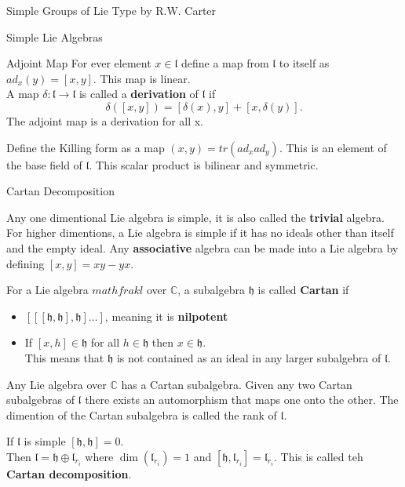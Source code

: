 \documentclass[12pt, letterpaper]{article}
\newcommand{\C}{\mathbb{C}}
\begin{document}
\begin{section}{Simple Groups of Lie Type by R.W. Carter}
\begin{subsection}{Simple Lie Algebras}
\begin{subsubsection}{Adjoint Map}
      For ever element \(x \in \mathfrak{l}\) define a map from \(\mathfrak{l}\)
      to itself as \(ad_{x}(y) = [x, y]\). This map is linear. \\
      A map \(\delta: \mathfrak{l} \to \mathfrak{l}\) is called a
      \textbf{derivation} of \(\mathfrak{l}\) if \[\delta([x, y]) =
        [\delta(x), y] + [x, \delta(y)].\] The adjoint map is a derivation for
      all x.

      Define the Killing form as a map \((x, y) = tr(ad_{x} ad_{y})\). This is
      an element of the base field of \(\mathfrak{l}\). This scalar product is
      bilinear and symmetric.

    \end{subsubsection}

    \begin{subsubsection}{Cartan Decomposition}

      Any one dimentional Lie algebra is simple, it is also called the
      \textbf{trivial} algebra. For higher dimentions, a Lie algebra is simple
      if it has no ideals other than itself and the empty ideal. Any
      \textbf{associative} algebra can be made into a Lie algebra by defining
      \([x, y] = xy - yx\).

      For a Lie algebra \(mathfrak{l}\) over \(\C\), a subalgebra
      \(\mathfrak{h}\) is called \textbf{Cartan} if
      \begin{itemize}
        \item \([[[\mathfrak{h}, \mathfrak{h}], \mathfrak{h}] \dots]\), meaning
              it is \textbf{nilpotent}
        \item If \([x, h] \in \mathfrak{h}\) for all \(h \in \mathfrak{h}\) then
              \(x \in \mathfrak{h}\). \\
              This means that \(\mathfrak{h}\) is not contained as an ideal in
              any larger subalgebra of \(\mathfrak{l}\).
      \end{itemize}

      Any Lie algebra over \(\C\) has a Cartan subalgebra. Given any two Cartan
      subalgebras of \(\mathfrak{l}\) there exists an automorphism that maps one
      onto the other. The dimention of the Cartan subalgebra is called the rank
      of \(\mathfrak{l}\).

      If \(\mathfrak{l}\) is simple \([\mathfrak{h}, \mathfrak{h}] = 0\). \\
      Then \(\mathfrak{l} = \mathfrak{h} \oplus \mathfrak{l}_{r_{i}}\) where
      \(\dim(\mathfrak{l}_{r_{i}}) = 1\) and \([\mathfrak{h},
      \mathfrak{l}_{r_{i}}] = \mathfrak{l}_{r_{i}}\). This is called teh
      \textbf{Cartan decomposition}.


\end{subsubsection}
\end{subsection}
\end{section}
\end{document}
